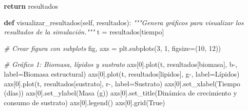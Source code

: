 \documentclass[
]{article}
\newenvironment{Shaded}{}{}
\newcommand{\CommentTok}[1]{\textcolor[rgb]{0.38,0.63,0.69}{\textit{#1}}}
\newcommand{\ControlFlowTok}[1]{\textcolor[rgb]{0.00,0.44,0.13}{\textbf{#1}}}
\newcommand{\DecValTok}[1]{\textcolor[rgb]{0.25,0.63,0.44}{#1}}
\newcommand{\KeywordTok}[1]{\textcolor[rgb]{0.00,0.44,0.13}{\textbf{#1}}}
\newcommand{\NormalTok}[1]{#1}
\newcommand{\OperatorTok}[1]{\textcolor[rgb]{0.40,0.40,0.40}{#1}}
\newcommand{\StringTok}[1]{\textcolor[rgb]{0.25,0.44,0.63}{#1}}
\newcommand{\VariableTok}[1]{\textcolor[rgb]{0.10,0.09,0.49}{#1}}
\begin{document}
\begin{Shaded}
\begin{Highlighting}[]
        \ControlFlowTok{return}\NormalTok{ resultados}
    
    \KeywordTok{def}\NormalTok{ visualizar\_resultados(}\VariableTok{self}\NormalTok{, resultados):}
        \CommentTok{"""Genera gráficos para visualizar los resultados de la simulación."""}
\NormalTok{        t }\OperatorTok{=}\NormalTok{ resultados[}\StringTok{\textquotesingle{}tiempo\textquotesingle{}}\NormalTok{]}
        
        \CommentTok{\# Crear figura con subplots}
\NormalTok{        fig, axs }\OperatorTok{=}\NormalTok{ plt.subplots(}\DecValTok{3}\NormalTok{, }\DecValTok{1}\NormalTok{, figsize}\OperatorTok{=}\NormalTok{(}\DecValTok{10}\NormalTok{, }\DecValTok{12}\NormalTok{))}
        
        \CommentTok{\# Gráfico 1: Biomasa, lípidos y sustrato}
\NormalTok{        axs[}\DecValTok{0}\NormalTok{].plot(t, resultados[}\StringTok{\textquotesingle{}biomasa\textquotesingle{}}\NormalTok{], }\StringTok{\textquotesingle{}b{-}\textquotesingle{}}\NormalTok{, label}\OperatorTok{=}\StringTok{\textquotesingle{}Biomasa estructural\textquotesingle{}}\NormalTok{)}
\NormalTok{        axs[}\DecValTok{0}\NormalTok{].plot(t, resultados[}\StringTok{\textquotesingle{}lipidos\textquotesingle{}}\NormalTok{], }\StringTok{\textquotesingle{}g{-}\textquotesingle{}}\NormalTok{, label}\OperatorTok{=}\StringTok{\textquotesingle{}Lípidos\textquotesingle{}}\NormalTok{)}
\NormalTok{        axs[}\DecValTok{0}\NormalTok{].plot(t, resultados[}\StringTok{\textquotesingle{}sustrato\textquotesingle{}}\NormalTok{], }\StringTok{\textquotesingle{}r{-}\textquotesingle{}}\NormalTok{, label}\OperatorTok{=}\StringTok{\textquotesingle{}Sustrato\textquotesingle{}}\NormalTok{)}
\NormalTok{        axs[}\DecValTok{0}\NormalTok{].set\_xlabel(}\StringTok{\textquotesingle{}Tiempo (días)\textquotesingle{}}\NormalTok{)}
\NormalTok{        axs[}\DecValTok{0}\NormalTok{].set\_ylabel(}\StringTok{\textquotesingle{}Masa (g)\textquotesingle{}}\NormalTok{)}
\NormalTok{        axs[}\DecValTok{0}\NormalTok{].set\_title(}\StringTok{\textquotesingle{}Dinámica de crecimiento y consumo de sustrato\textquotesingle{}}\NormalTok{)}
\NormalTok{        axs[}\DecValTok{0}\NormalTok{].legend()}
\NormalTok{        axs[}\DecValTok{0}\NormalTok{].grid(}\VariableTok{True}\NormalTok{)}
        

\end{Highlighting}
\end{Shaded}
\end{document}
